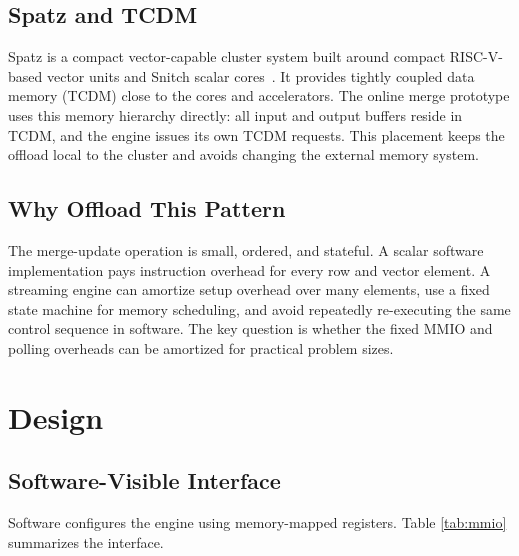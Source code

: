 \documentclass[conference]{IEEEtran}
\begin{document}
\subsection{Spatz and TCDM}

Spatz is a compact vector-capable cluster system built around compact
RISC-V-based vector units and Snitch scalar cores~\cite{spatz2023,snitch2020}.
It provides tightly coupled data memory (TCDM) close to the cores and
accelerators. The online merge prototype
uses this memory hierarchy directly: all input and output buffers reside in
TCDM, and the engine issues its own TCDM requests. This placement keeps the
offload local to the cluster and avoids changing the external memory system.

\subsection{Why Offload This Pattern}

The merge-update operation is small, ordered, and stateful. A scalar software
implementation pays instruction overhead for every row and vector element. A
streaming engine can amortize setup overhead over many elements, use a fixed
state machine for memory scheduling, and avoid repeatedly re-executing the same
control sequence in software. The key question is whether the fixed MMIO and
polling overheads can be amortized for practical problem sizes.

\section{Design}

\subsection{Software-Visible Interface}

Software configures the engine using memory-mapped registers. Table
\ref{tab:mmio} summarizes the interface.
\end{document}
